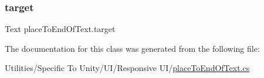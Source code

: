 \subsubsection{\texorpdfstring{target}{target}}
{\footnotesize\ttfamily Text place\+To\+End\+Of\+Text.\+target}



The documentation for this class was generated from the following file\+:\begin{DoxyCompactItemize}
\item 
Utilities/\+Specific To Unity/\+U\+I/\+Responsive U\+I/\hyperlink{place_to_end_of_text_8cs}{place\+To\+End\+Of\+Text.\+cs}\end{DoxyCompactItemize}
